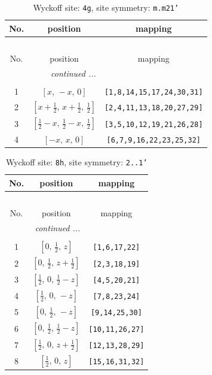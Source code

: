 \documentclass[fleqn,8pt]{jsarticle}
\begin{document}
\renewcommand{\arraystretch}{1.2}
\begin{longtable}{ccc}
\caption{Wyckoff site: {\tt 4g}, site symmetry: {\tt m.m21'}}
 \\
 \hline \hline
No. & position & mapping \\ \hline \endfirsthead

\multicolumn{2}{l}{\tablename\ \thetable{}} \\
 \hline \hline
No. & position & mapping \\ \hline \endhead

 \hline \hline
\multicolumn{2}{r}{\footnotesize\it continued ...} \\ \endfoot

 \hline \hline
\multicolumn{2}{r}{} \\ \endlastfoot

1 & $\left[ x,\, - x,\, 0 \right]$ & {\tt [1,8,14,15,17,24,30,31]} \\ \hline
2 & $\left[ x + \frac{1}{2},\, x + \frac{1}{2},\, \frac{1}{2} \right]$ & {\tt [2,4,11,13,18,20,27,29]} \\ \hline
3 & $\left[ \frac{1}{2} - x,\, \frac{1}{2} - x,\, \frac{1}{2} \right]$ & {\tt [3,5,10,12,19,21,26,28]} \\ \hline
4 & $\left[ - x,\, x,\, 0 \right]$ & {\tt [6,7,9,16,22,23,25,32]} \\
\end{longtable}
\renewcommand{\arraystretch}{1.2}
\begin{longtable}{ccc}
\caption{Wyckoff site: {\tt 8h}, site symmetry: {\tt 2..1'}}
 \\
 \hline \hline
No. & position & mapping \\ \hline \endfirsthead

\multicolumn{2}{l}{\tablename\ \thetable{}} \\
 \hline \hline
No. & position & mapping \\ \hline \endhead

 \hline \hline
\multicolumn{2}{r}{\footnotesize\it continued ...} \\ \endfoot

 \hline \hline
\multicolumn{2}{r}{} \\ \endlastfoot

1 & $\left[ 0,\, \frac{1}{2},\, z \right]$ & {\tt [1,6,17,22]} \\ \hline
2 & $\left[ 0,\, \frac{1}{2},\, z + \frac{1}{2} \right]$ & {\tt [2,3,18,19]} \\ \hline
3 & $\left[ \frac{1}{2},\, 0,\, \frac{1}{2} - z \right]$ & {\tt [4,5,20,21]} \\ \hline
4 & $\left[ \frac{1}{2},\, 0,\, - z \right]$ & {\tt [7,8,23,24]} \\ \hline
5 & $\left[ 0,\, \frac{1}{2},\, - z \right]$ & {\tt [9,14,25,30]} \\ \hline
6 & $\left[ 0,\, \frac{1}{2},\, \frac{1}{2} - z \right]$ & {\tt [10,11,26,27]} \\ \hline
7 & $\left[ \frac{1}{2},\, 0,\, z + \frac{1}{2} \right]$ & {\tt [12,13,28,29]} \\ \hline
8 & $\left[ \frac{1}{2},\, 0,\, z \right]$ & {\tt [15,16,31,32]} \\
\end{longtable}
\end{document}
